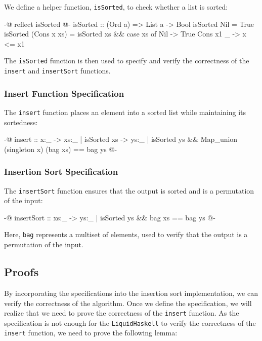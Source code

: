 \documentclass[]{rptuseminar}
\begin{document}
We define a helper function, \texttt{isSorted}, to check whether a list is sorted:

\begin{haskell}
{-@ reflect isSorted @-}
isSorted :: (Ord a) => List a -> Bool
isSorted Nil = True
isSorted (Cons x xs) =
  isSorted xs && case xs of
    Nil        -> True
    Cons x1 _  -> x <= x1
\end{haskell}

The \texttt{isSorted} function is then used to specify and verify the correctness of the \texttt{insert} and \texttt{insertSort} functions.

\subsubsection{Insert Function Specification}

The \texttt{insert} function places an element into a sorted list while maintaining its sortedness:

\begin{haskell}
{-@ insert :: x:_ -> {xs:_ | isSorted xs} 
  -> {ys:_ | isSorted ys && Map_union (singleton x) (bag xs) == bag ys  } @-}
\end{haskell}

\subsubsection{Insertion Sort Specification}

The \texttt{insertSort} function ensures that the output is sorted and is a permutation of the input:

\begin{haskell}
{-@ insertSort :: xs:_ -> {ys:_ | isSorted ys && bag xs == bag ys} @-}
\end{haskell}

Here, \texttt{bag} represents a multiset of elements, used to verify that the output is a permutation of the input.

\subsection{Proofs}
By incorporating the specifications into the insertion sort implementation, we can verify the correctness of the algorithm.
Once we define the specification, we will realize that we need to prove the correctness of the \texttt{insert} function.
As the specification is not enough for the \texttt{LiquidHaskell} to verify the correctness of the \texttt{insert} function, we need to prove the following lemma:
\end{document}
